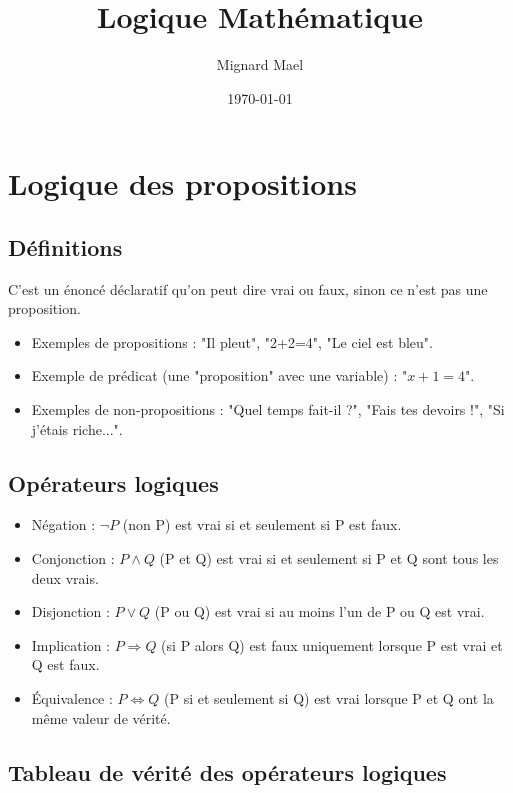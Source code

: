 \documentclass[a4paper,12pt]{article}
\title{Logique Mathématique}
\author{Mignard Mael}
\date{\today}
\begin{document}
\maketitle
\tableofcontents
\newpage

\section{Logique des propositions}
\subsection{Définitions}

C'est un énoncé déclaratif qu'on peut dire vrai ou faux, sinon ce n'est pas une proposition.
\begin{itemize}
    \item Exemples de propositions : "Il pleut", "2+2=4", "Le ciel est bleu".
    \item Exemple de prédicat (une "proposition" avec une variable) : "$x+1=4$".
    \item Exemples de non-propositions : "Quel temps fait-il ?", "Fais tes devoirs !", "Si j'étais riche...".
\end{itemize}

\subsection{Opérateurs logiques}

\begin{itemize}
    \item Négation : $\neg P$ (non P) est vrai si et seulement si P est faux.
    \item Conjonction : $P \wedge Q$ (P et Q) est vrai si et seulement si P et Q sont tous les deux vrais.
    \item Disjonction : $P \vee Q$ (P ou Q) est vrai si au moins l'un de P ou Q est vrai.
    \item Implication : $P \Rightarrow Q$ (si P alors Q) est faux uniquement lorsque P est vrai et Q est faux.
    \item Équivalence : $P \Leftrightarrow Q$ (P si et seulement si Q) est vrai lorsque P et Q ont la même valeur de vérité.
\end{itemize}

\subsection{Tableau de vérité des opérateurs logiques}
\end{document}

